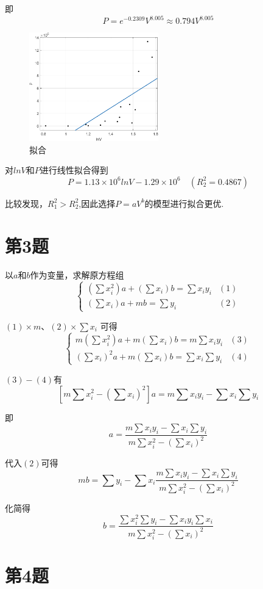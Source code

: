 \documentclass{article}
\begin{document}
即
\[P = e^{-0.2309}V^{8.005} \approx 0.794V^{8.005}\]

\begin{figure}[!h]
    \centering
    \includegraphics[width=0.5\textwidth]{picture/hw4_4.png}
    \caption{拟合}
\end{figure}

对$lnV$和$P$进行线性拟合得到
\[P = 1.13 \times 10^6 lnV - 1.29 \times 10^6 \quad (R_2^2 = 0.4867)\]

比较发现，$R_1^2>R^2_2$,因此选择$P=aV^b$的模型进行拟合更优.


\section{第3题}
以$a$和$b$作为变量，求解原方程组
\[
\begin{cases}
(\sum x_i^2)a + (\sum x_i)b = \sum x_iy_i & (1)
\\
(\sum x_i)a + mb = \sum y_i & (2)
\end{cases} 
\]

$(1) \times m$、$(2) \times \sum x_i$ 可得
\[
\begin{cases}
m(\sum x_i^2)a + m(\sum x_i)b = m\sum x_iy_i & (3)
\\
(\sum x_i)^2a + m(\sum x_i)b = \sum x_i \sum y_i & (4)
\end{cases} 
\]

$(3) - (4)$有
\[[m\sum x_i^2 - (\sum x_i)^2]a = m\sum x_iy_i - \sum x_i \sum y_i\]

即
\[a = \frac{m\sum x_iy_i - \sum x_i \sum y_i}{m\sum x_i^2 - (\sum x_i)^2}\]

代入$(2)$可得
\[
mb = \sum y_i - \sum x_i \frac{m\sum x_iy_i - \sum x_i \sum y_i}{m\sum x_i^2 - (\sum x_i)^2}
\]

化简得
\[b = \frac{\sum x_i^2 \sum y_i - \sum x_iy_i \sum x_i}{m\sum x_i^2 - (\sum x_i)^2}\]


\newpage

\section{第4题}
\end{document}
